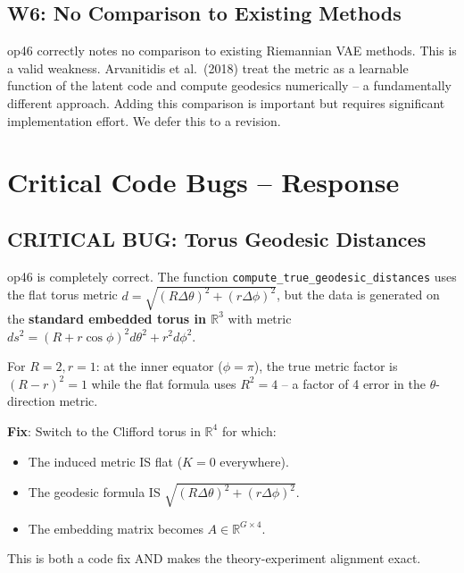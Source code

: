 \documentclass{article}
\begin{document}
\subsection{W6: No Comparison to Existing Methods}

\begin{partial}
op46 correctly notes no comparison to existing Riemannian VAE methods. This is
a valid weakness. Arvanitidis et al.\ (2018) treat the metric as a learnable
function of the latent code and compute geodesics numerically -- a fundamentally
different approach. Adding this comparison is important but requires significant
implementation effort. We defer this to a revision.
\end{partial}

\section{Critical Code Bugs -- Response}

\subsection{CRITICAL BUG: Torus Geodesic Distances}

\begin{accept}
op46 is completely correct. The function \texttt{compute\_true\_geodesic\_distances}
uses the flat torus metric $d = \sqrt{(R\Delta\theta)^2 + (r\Delta\phi)^2}$,
but the data is generated on the \textbf{standard embedded torus in $\mathbb{R}^3$}
with metric $ds^2 = (R + r\cos\phi)^2 d\theta^2 + r^2 d\phi^2$.

For $R=2, r=1$: at the inner equator ($\phi=\pi$), the true metric factor is
$(R-r)^2 = 1$ while the flat formula uses $R^2 = 4$ -- a factor of 4 error in
the $\theta$-direction metric.

\textbf{Fix}: Switch to the Clifford torus in $\mathbb{R}^4$ for which:
\begin{itemize}
  \item The induced metric IS flat ($K = 0$ everywhere).
  \item The geodesic formula IS $\sqrt{(R\Delta\theta)^2 + (r\Delta\phi)^2}$.
  \item The embedding matrix becomes $A \in \mathbb{R}^{G \times 4}$.
\end{itemize}
This is both a code fix AND makes the theory-experiment alignment exact.
\end{accept}
\end{document}
